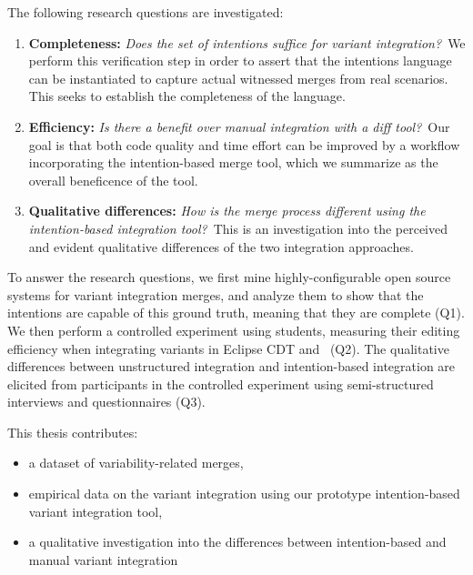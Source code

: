 The following research questions are investigated:

\newcommand{\RQA}{Does the set of intentions suffice for variant integration?}
\newcommand{\RQB}{Is there a benefit over manual integration with a diff tool?}
\newcommand{\RQC}{How is the merge process different using the intention-based integration tool?}

\begin{enumerate}[label={Q\arabic*}]

        \item\label{rq-a} \textbf{Completeness:} \textit{\RQA}~We perform this verification step in order to assert that the intentions language can be instantiated to capture actual witnessed merges from real scenarios. This seeks to establish the completeness of the language.

        \item\label{rq-b} \textbf{Efficiency:} \textit{\RQB}~Our goal is that both code quality and time effort can be improved by a workflow incorporating the intention-based merge tool, which we summarize as the overall beneficence of the tool.

        
        \item\label{rq-c} \textbf{Qualitative differences:} \textit{\RQC}~This is an investigation into the perceived and evident qualitative differences of the two integration approaches.
        
\end{enumerate}

To answer the research questions, we first mine highly-configurable open source systems for variant integration merges, and analyze them to show that the intentions are capable of this ground truth, meaning that they are complete (Q1). We then perform a controlled experiment using students, measuring their editing efficiency when integrating variants in Eclipse CDT and \tooln~(Q2). The qualitative differences between unstructured integration and intention-based integration are elicited from participants in the controlled experiment using semi-structured interviews and questionnaires (Q3).

This thesis contributes:
\begin{itemize}
    \item a dataset of variability-related merges,
    \item empirical data on the variant integration using our prototype intention-based variant integration tool,
    \item a qualitative investigation into the differences between intention-based and manual variant integration
\end{itemize}

